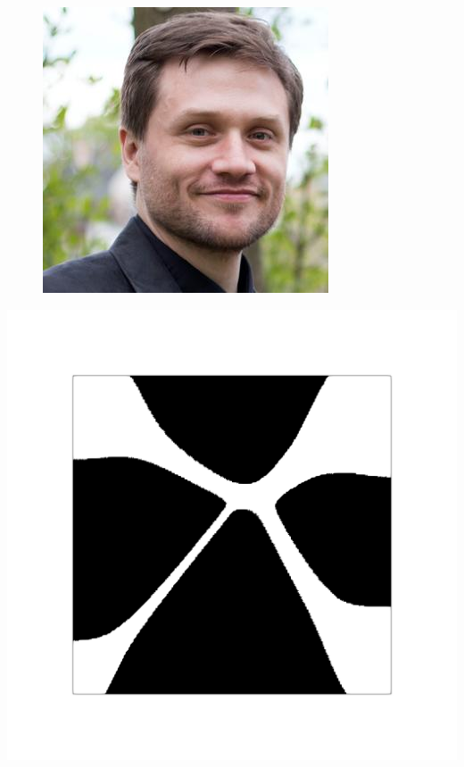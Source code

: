 \documentclass[aspectratio=169,xcolor=dvipsnames,11pt]{beamer}
\begin{document}
\begin{frame}
\begin{minipage}{0.3\linewidth}
\begin{figure}
{\begin{minipage}[b]{0.38\textwidth}
  \end{minipage}}%
  \hfill
  \begin{minipage}[b]{0.46\textwidth}
    \includegraphics[width=\linewidth]{figures/rautenberg.jpg}
  \end{minipage}
\end{figure}
 \begin{minipage}[b]{0.5\textwidth}
    \includegraphics[width=\linewidth]{figures/global_feasible_active_set.png}

\end{minipage}
\end{minipage}
\end{frame}
\end{document}

